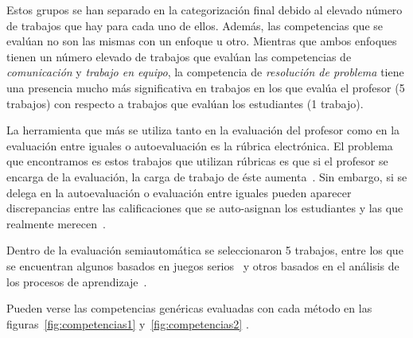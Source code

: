 Estos grupos se han separado en la categorización final debido al elevado número de trabajos que hay para cada uno de ellos. Además, las competencias que se evalúan no son las mismas con un enfoque u otro. Mientras que ambos enfoques tienen un número elevado de trabajos que evalúan las competencias de \emph{comunicación} y \emph{trabajo en equipo}, la competencia de \emph{resolución de problema} tiene una presencia mucho más significativa en trabajos en los que evalúa el profesor (5 trabajos) con respecto a trabajos que evalúan los estudiantes (1 trabajo).

La herramienta que más se utiliza tanto en la evaluación del profesor como en la evaluación entre iguales o autoevaluación es la rúbrica electrónica. El problema que encontramos es estos trabajos que utilizan rúbricas es que si el profesor se encarga de la evaluación, la carga de trabajo de éste aumenta~\cite{lacuesta2009active}. Sin embargo, si se delega en la autoevaluación o evaluación entre iguales pueden aparecer discrepancias entre las calificaciones que se auto-asignan los estudiantes y las que realmente merecen~\cite{carreras2013promotion}. 

Dentro de la evaluación semiautomática se seleccionaron 5 trabajos, entre los que se encuentran algunos basados en juegos serios~\cite{djaouti2011classifying,bedek2011behavioral} y otros basados en el análisis de los procesos de aprendizaje~\cite{rayon2014web,fidalgo:2015}.

Pueden verse las competencias genéricas evaluadas con cada método en las figuras~\ref{fig:competencias1} y~\ref{fig:competencias2} .

